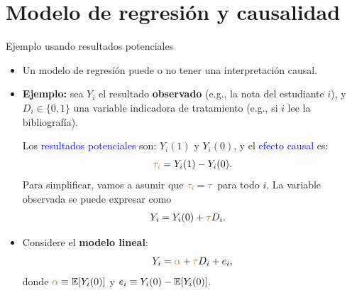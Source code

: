 \documentclass[9pt, xcolor=dvipsnames]{beamer}
\begin{document}


\section{Modelo de regresión y causalidad}

\begin{frame}{Ejemplo usando resultados potenciales}
\begin{itemize}
    \item Un modelo de regresión puede o no tener una interpretación causal. %
    \item \textbf{Ejemplo:} sea $Y_i$ el resultado \textbf{observado} (e.g., la nota del estudiante $i$), y $D_i \in \{0,1\}$ una variable indicadora de tratamiento (e.g., si $i$ lee la bibliografía). %
    
    \vspace{0.5em}
    Los \textcolor{blue}{resultados potenciales} son: \(Y_i(1)\) y \(Y_i(0)\), y el \textcolor{blue}{efecto causal} es: 
    \[ 
        \textcolor{brown}{\tau_i} = Y_i(1) - Y_i(0).
    \]
    Para simplificar, vamos a asumir que \(\textcolor{brown}{\tau_i} = \textcolor{brown}{\tau}\) para todo \(i\). %
    \vspace{0.5em}    
    La variable observada se puede expresar como
	\begin{align*}
    \begin{split}
        Y_i &= Y_i(0) + \textcolor{brown}{\tau} D_i.
    \end{split}		
    \end{align*}
    \item Considere el \textbf{modelo lineal}:
    \vspace{-0.5em}
    \[
        Y_i = \textcolor{brown}{\alpha} + \textcolor{brown}{\tau} D_i + e_i,
    \]
        donde \(\textcolor{brown}{\alpha} \equiv \operatorname{\mathbb{E}}[Y_i(0)]\) y \(e_i \equiv Y_i(0) - \operatorname{\mathbb{E}}[Y_i(0)]\). 
\end{itemize}
\end{frame}
\end{document}
